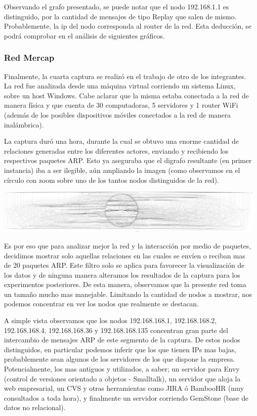 Observando el grafo presentado, se puede notar que el nodo 192.168.1.1 es distinguido, por la cantidad de mensajes de tipo Replay que salen de mismo. Probablemente, la ip del nodo corresponda al router de la red. Esta  deducción, se podrá comprobar en el análisis de siguientes gráficos.

\subsubsection{Red Mercap}
Finalmente, la cuarta captura se realizó en el trabajo de otro de los integrantes. La red fue analizada desde una máquina virtual corriendo un sistema Linux, sobre un host Windows. Cabe aclarar que la misma estaba conectada a la red de manera física y que cuenta de 30 computadoras, 5 servidores y 1 router WiFi (además de los posibles dispositivos móviles conectados a la red de manera inalámbrica).

La captura duró una hora, durante la cual se obtuvo una enorme cantidad de relaciones generadas entre los diferentes actores, enviando y recibiendo los respectivos paquetes ARP. Esto ya aseguraba que el digrafo resultante (en primer instancia) iba a ser ilegible, aún ampliando la imagen (como observamos en el círculo con zoom sobre uno de los tantos nodos distinguidos de la red). 

\newline
\centerline{\includegraphics[angle=0,scale=0.3]{./graficos/grafos-arp/grafo_laburo_eze1.png}}

Es por eso que para analizar mejor la red y la interacción por medio de paquetes, decidimos mostrar solo aquellas relaciones en las cuales se envíen o reciban mas de 20 paquetes ARP. Este filtro solo se aplica para favorecer la visualización de los datos y de ninguna manera alteramos los resultados de la captura para los experimentos posteriores. De esta manera, observamos que la presente red toma un tamaño mucho mas manejable. Limitando la cantidad de nodos a mostrar, nos podemos concentrar en ver los nodos que realmente se destacan.

A simple vista observamos que los nodos 192.168.168.1, 192.168.168.2, 192.168.168.4, 192.168.168.36 y 192.168.168.135 concentran gran parte del intercambio de mensajes ARP de este segmento de la captura. De estos nodos distinguidos, en particular podemos inferir que los que tienen IPs mas bajas, probablemente sean algunos de los servidores de los que dispone la empresa. Potencialmente, los mas antiguos y utilizados, a saber; un servidor para Envy (control de versiones orientado a objetos - Smalltalk), un servidor que aloja la web empresarial, un CVS y otras herramientas como JIRA ó BambooHR (muy consultados a toda hora), y finalmente un servidor corriendo GemStone (base de datos no relacional).

